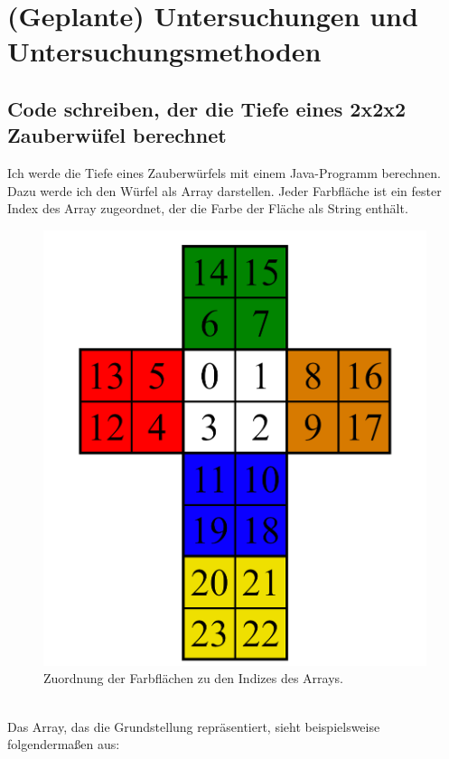 \documentclass[12pt,a4paper, usenames, dvipsnames]{scrartcl}
\begin{document}
\newpage


\section{(Geplante) Untersuchungen und Untersuchungsmethoden}



\subsection*{Code schreiben, der die Tiefe eines 2x2x2 Zauberwüfel berechnet}

Ich werde die Tiefe eines Zauberwürfels mit einem Java-Programm berechnen. Dazu werde ich den Würfel als Array darstellen. Jeder Farbfläche ist ein fester Index des Array zugeordnet, der die Farbe der Fläche als String enthält. \\
\begin{figure}[h]
\centering
\includegraphics[scale=0.15]{2x2foldedout.png}
\caption{Zuordnung der Farbflächen zu den Indizes des Arrays.}
\end{figure}
\\
Das Array, das die Grundstellung repräsentiert, sieht beispielsweise folgendermaßen aus:
\end{document}
